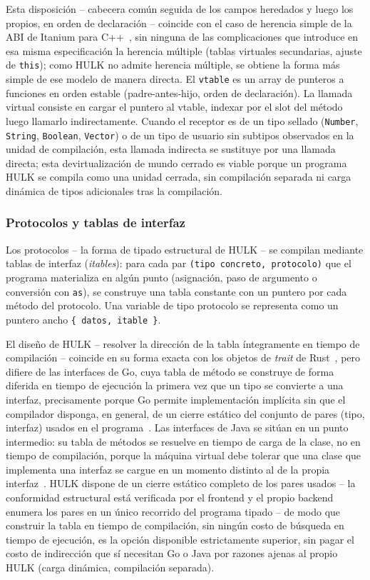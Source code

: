 \documentclass[12pt, a4paper]{article}
\begin{document}
Esta disposición -- cabecera común seguida de los campos heredados y luego
los propios, en orden de declaración -- coincide con el caso de herencia
simple de la ABI de Itanium para C++~\cite{itanium-abi}, sin ninguna de las
complicaciones que introduce en esa misma especificación la herencia múltiple
(tablas virtuales secundarias, ajuste de \texttt{this}); como HULK no admite
herencia múltiple, se obtiene la forma más simple de ese modelo de manera
directa. El \texttt{vtable} es un array de punteros a funciones en orden estable
(padre-antes-hijo, orden de declaraci\'{o}n). La llamada virtual consiste en cargar 
el puntero al vtable, indexar por el slot del m\'{e}todo luego llamarlo indirectamente.
Cuando el receptor es de un tipo sellado (\texttt{Number}, \texttt{String},
\texttt{Boolean}, \texttt{Vector}) o de un tipo de usuario sin subtipos
observados en la unidad de compilación, esta llamada indirecta se sustituye por
una llamada directa; esta devirtualización de mundo cerrado es viable porque un
programa HULK se compila como una unidad cerrada, sin compilación separada ni
carga dinámica de tipos adicionales tras la compilación.

\subsubsection{Protocolos y tablas de interfaz}

Los protocolos -- la forma de tipado estructural de HULK -- se compilan
mediante tablas de interfaz (\textit{itables}): para cada par
\texttt{(tipo concreto, protocolo)} que el programa materializa en algún punto
(asignación, paso de argumento o conversión con \texttt{as}), se construye una
tabla constante con un puntero por cada método del protocolo. Una variable de
tipo protocolo se representa como un puntero ancho \texttt{\{ datos, itable \}}.

El diseño de HULK -- resolver la dirección de la tabla íntegramente en tiempo
de compilación -- coincide en su forma exacta con los objetos de \textit{trait}
de Rust~\cite{klabnik2019}, pero difiere de las interfaces de Go, cuya tabla de
método se construye de forma diferida en tiempo de ejecución la primera vez que
un tipo se convierte a una interfaz, precisamente porque Go permite
implementación implícita sin que el compilador disponga, en general, de un
cierre estático del conjunto de pares (tipo, interfaz) usados en el
programa~\cite{donovan2015}. Las interfaces de Java se sitúan en un punto
intermedio: su tabla de métodos se resuelve en tiempo de carga de la clase, no
en tiempo de compilación, porque la máquina virtual debe tolerar que una clase
que implementa una interfaz se cargue en un momento distinto al de la propia
interfaz~\cite{gosling2021}. HULK dispone de un cierre estático completo de los
pares usados -- la conformidad estructural está verificada por el frontend y
el propio backend enumera los pares en un único recorrido del programa tipado
-- de modo que construir la tabla en tiempo de compilación, sin ningún costo
de búsqueda en tiempo de ejecución, es la opción disponible estrictamente
superior, sin pagar el costo de indirección que sí necesitan Go o Java por
razones ajenas al propio HULK (carga dinámica, compilación separada).
\end{document}
